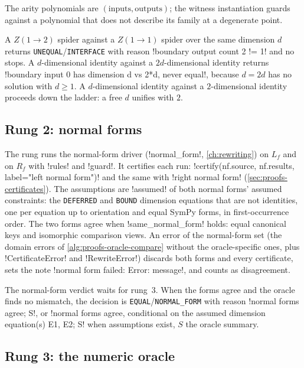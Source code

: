 The arity polynomials are $(\text{inputs},\text{outputs})$; the witness instantiation guards against a polynomial that does not describe its family at a degenerate point.

\begin{example}
A $Z(1\to2)$ spider against a $Z(1\to1)$ spider over the same dimension $d$ returns \texttt{UNEQUAL}/\allowbreak\texttt{INTERFACE} with reason \code!boundary output count 2 != 1! and no stops. A $d$-dimensional identity against a $2d$-dimensional identity returns \code!boundary input 0 has dimension d vs 2*d, never equal!, because $d=2d$ has no solution with $d\ge1$. A $d$-dimensional identity against a $2$-dimensional identity proceeds down the ladder: a free $d$ unifies with $2$.
\end{example}

\subsection{Rung 2: normal forms}\label{sec:proofs-rung-nf}

The rung runs the normal-form driver (\py!normal_form!, \cref{ch:rewriting}) on $L_f$ and on $R_f$ with \py!rules! and \py!guard!. It certifies each run: \py!certify(nf.source, nf.results, label="left normal form")! and the same with \code!right normal form! (\cref{sec:proofs-certificates}). The assumptions are \py!assumed! of both normal forms' assumed constraints: the \texttt{DEFERRED} and \texttt{BOUND} dimension equations that are not identities, one per equation up to orientation and equal SymPy forms, in first-occurrence order. The two forms agree when \py!same_normal_form! holds: equal canonical keys and isomorphic comparison views. An error of the normal-form set (the domain errors of \cref{alg:proofs-oracle-compare} without the oracle-specific ones, plus \py!CertificateError! and \py!RewriteError!) discards both forms and every certificate, sets the note \code!normal form failed: Error: message!, and counts as disagreement.

The normal-form verdict waits for rung~3. When the forms agree and the oracle finds no mismatch, the decision is \texttt{EQUAL}/\allowbreak\texttt{NORMAL\_FORM} with reason \code!normal forms agree; S!, or \code!normal forms agree, conditional on the assumed dimension equation(s) E1, E2; S! when assumptions exist, $S$ the oracle summary.

\subsection{Rung 3: the numeric oracle}


